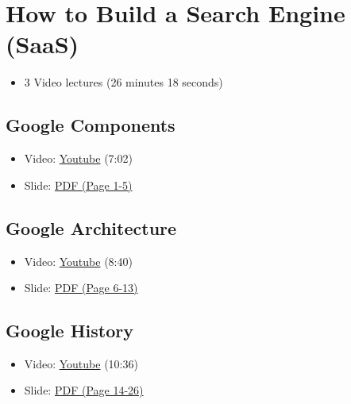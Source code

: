\FILENAME

\section{How to Build a Search Engine
(SaaS)}\label{how-to-build-a-search-engine-saas}

\begin{itemize}
\item
  3 Video lectures (26 minutes 18 seconds)
\end{itemize}

\subsection{Google Components}\label{google-components}

\begin{itemize}
\item
  Video: \href{https://www.youtube.com/watch?v=IWMcv7HbbPM}{Youtube}
  (7:02)
\item
  Slide:
  \href{https://drive.google.com/open?id=0B88HKpainTSfYWZ0dDlrNThkVms}{PDF
  (Page 1-5)}
\end{itemize}

\subsection{Google Architecture}\label{google-architecture}

\begin{itemize}
\item
  Video: \href{https://www.youtube.com/watch?v=syZHezdbdRY}{Youtube}
  (8:40)
\item
  Slide:
  \href{https://drive.google.com/open?id=0B88HKpainTSfYWZ0dDlrNThkVms}{PDF
  (Page 6-13)}
\end{itemize}

\subsection{Google History}\label{google-history}

\begin{itemize}

\item
  Video: \href{https://www.youtube.com/watch?v=Kg0NK0XUkHw}{Youtube}
  (10:36)
\item
  Slide:
  \href{https://drive.google.com/open?id=0B88HKpainTSfYWZ0dDlrNThkVms}{PDF
  (Page 14-26)}
\end{itemize}
